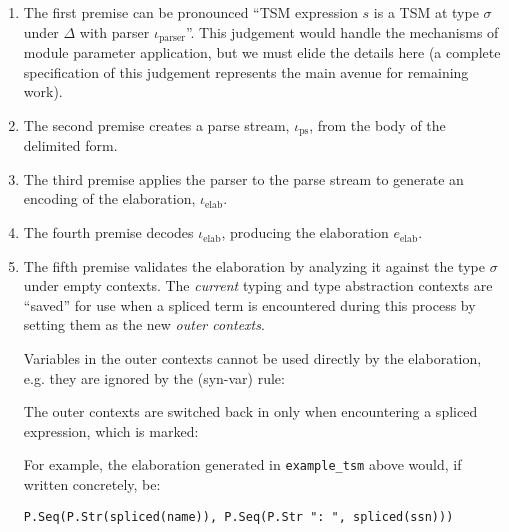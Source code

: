 \begin{enumerate}
\item The first premise can be pronounced ``TSM expression $s$ is a TSM at type $\sigma$ under $\Delta$ with parser $\iota_\text{parser}$''. This judgement would handle the mechanisms of module parameter application, but we must elide the details here (a complete specification of this judgement represents the main avenue for remaining work). %
\item The second premise creates a parse stream, $\iota_\text{ps}$, from the body of the delimited form.
\item The third premise applies the parser to the parse stream to generate an encoding of the elaboration, $\iota_\text{elab}$.
\item The fourth premise decodes $\iota_\text{elab}$, producing the elaboration $e_\text{elab}$.
\item The fifth premise validates the elaboration by analyzing it against the type $\sigma$ under empty contexts. The \emph{current} typing and type abstraction contexts are ``saved'' for use when a spliced term is encountered during this process by setting them as the new \emph{outer contexts}.

Variables in the outer contexts cannot be used directly by the elaboration, e.g. they are ignored by the (syn-var) rule:
\begin{mathpar}
\end{mathpar}
The outer contexts are switched back in only when encountering a spliced expression, which is marked:
\begin{mathpar}

\end{mathpar}
For example, the elaboration generated in \lstinline{example_tsm} above would, if written concretely, be:
\begin{lstlisting}[numbers=none]
P.Seq(P.Str(spliced(name)), P.Seq(P.Str ": ", spliced(ssn)))
\end{lstlisting}
\end{enumerate}

